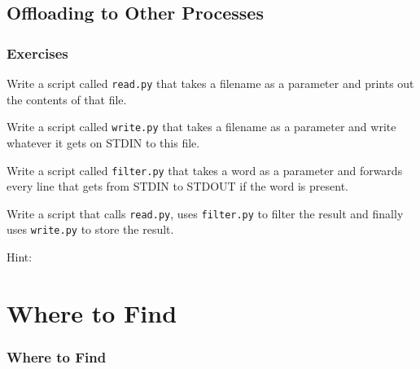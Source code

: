 {\subsection{Offloading to Other Processes}
\begin{frame}[fragile]
    \frametitle{Exercises }
    \vspace{3mm}
    Write a script called \texttt{read.py} that takes a filename as a parameter and prints out the contents of that file.
    
    \vspace{5mm}
    Write a script called \texttt{write.py} that takes a filename as a parameter and write whatever it gets on STDIN to this file.
    
    \vspace{5mm}
    Write a script called \texttt{filter.py} that takes a word as a parameter and forwards every line that gets from STDIN to STDOUT if the word is present.
    
    \vspace{5mm}
    Write a script that calls \texttt{read.py}, uses \texttt{filter.py} to filter the result and finally uses \texttt{write.py} to store the result.
    
    \vspace{5mm}
    Hint: 
\end{frame}

}


\section{Where to Find}
\begin{frame}
  \frametitle{\textbf{Where to Find}}
  \vspace{0mm}
  \begin{center}
    
  \end{center}
\end{frame}


